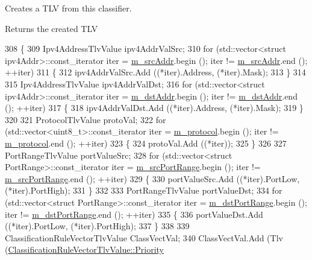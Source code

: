 Creates a T\+LV from this classifier. 

\begin{DoxyReturn}{Returns}
the created T\+LV 
\end{DoxyReturn}

\begin{DoxyCode}
308 \{
309   Ipv4AddressTlvValue ipv4AddrValSrc;
310   \textcolor{keywordflow}{for} (std::vector<struct ipv4Addr>::const\_iterator iter = \hyperlink{classns3_1_1IpcsClassifierRecord_a9135b69bdf633be39cc1f848ef2bcaf3}{m\_srcAddr}.begin (); iter != 
      \hyperlink{classns3_1_1IpcsClassifierRecord_a9135b69bdf633be39cc1f848ef2bcaf3}{m\_srcAddr}.end (); ++iter)
311     \{
312       ipv4AddrValSrc.Add ((*iter).Address, (*iter).Mask);
313     \}
314 
315   Ipv4AddressTlvValue ipv4AddrValDst;
316   \textcolor{keywordflow}{for} (std::vector<struct ipv4Addr>::const\_iterator iter = \hyperlink{classns3_1_1IpcsClassifierRecord_a9c1f0a02b48ca1a7f54c655f26779812}{m\_dstAddr}.begin (); iter != 
      \hyperlink{classns3_1_1IpcsClassifierRecord_a9c1f0a02b48ca1a7f54c655f26779812}{m\_dstAddr}.end (); ++iter)
317     \{
318       ipv4AddrValDst.Add ((*iter).Address, (*iter).Mask);
319     \}
320 
321   ProtocolTlvValue protoVal;
322   \textcolor{keywordflow}{for} (std::vector<uint8\_t>::const\_iterator iter = \hyperlink{classns3_1_1IpcsClassifierRecord_adfc6f43d00633b034bc8940a7ae9126c}{m\_protocol}.begin (); iter != 
      \hyperlink{classns3_1_1IpcsClassifierRecord_adfc6f43d00633b034bc8940a7ae9126c}{m\_protocol}.end (); ++iter)
323     \{
324       protoVal.Add ((*iter));
325     \}
326 
327   PortRangeTlvValue portValueSrc;
328   \textcolor{keywordflow}{for} (std::vector<struct PortRange>::const\_iterator iter = \hyperlink{classns3_1_1IpcsClassifierRecord_a8874820a9cc87b52444b2d4d3b739266}{m\_srcPortRange}.begin (); iter != 
      \hyperlink{classns3_1_1IpcsClassifierRecord_a8874820a9cc87b52444b2d4d3b739266}{m\_srcPortRange}.end (); ++iter)
329     \{
330       portValueSrc.Add ((*iter).PortLow, (*iter).PortHigh);
331     \}
332 
333   PortRangeTlvValue portValueDst;
334   \textcolor{keywordflow}{for} (std::vector<struct PortRange>::const\_iterator iter = \hyperlink{classns3_1_1IpcsClassifierRecord_a5605fcdc93dfbdc7c64f3b203e002061}{m\_dstPortRange}.begin (); iter != 
      \hyperlink{classns3_1_1IpcsClassifierRecord_a5605fcdc93dfbdc7c64f3b203e002061}{m\_dstPortRange}.end (); ++iter)
335     \{
336       portValueDst.Add ((*iter).PortLow, (*iter).PortHigh);
337     \}
338 
339   ClassificationRuleVectorTlvValue ClassVectVal;
340   ClassVectVal.Add (Tlv (\hyperlink{classns3_1_1ClassificationRuleVectorTlvValue_a9945c44c631de44d3b9c8dc9560cb820afb33cbae5e7663e0ffec4d0ec84520ec}{ClassificationRuleVectorTlvValue::Priority}

\end{DoxyCode}
